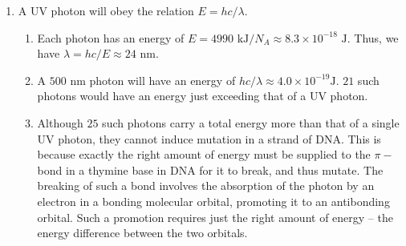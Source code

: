 \documentclass[10pt]{article}
\begin{document}
\begin{enumerate}
                \item A UV photon will obey the relation $E = hc/\lambda$.
                \begin{enumerate}
                        \item Each photon has an energy of $E = 4990 \text{ kJ} / N_A \approx 8.3 \times 10^{-18} \text{ J}$.
                        Thus, we have $\lambda = hc/E \approx 24 \text{ nm}$.
                        \item A $500 \text{ nm}$ photon will have an energy of $hc/\lambda \approx 4.0 \times 10^{-19} \text {J}$.
                        $21$ such photons would have an energy just exceeding that of a UV photon.
                        \item Although $25$ such photons carry a total energy more than that of a single UV photon, they cannot
                        induce mutation in a strand of DNA. This is because exactly the right amount of energy must be supplied
                        to the $\pi-$bond in a thymine base in DNA for it to break, and thus mutate. The breaking of such a bond
                        involves the absorption of the photon by an electron in a bonding molecular orbital, promoting it to an antibonding orbital.
                        Such a promotion requires just the right amount of energy -- the energy difference between the two orbitals.
                \end{enumerate}
        \end{enumerate}
\end{document}

